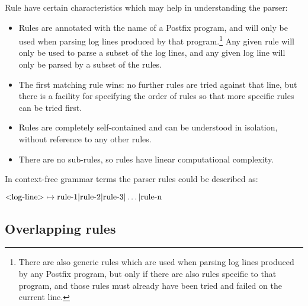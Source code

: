 \documentclass[a4paper,12pt,draft]{article}
\begin{document}
Rule have certain characteristics which may help in understanding the
parser:

\begin{itemize}

    \item Rules are annotated with the name of a Postfix program, and will
        only be used when parsing log lines produced by that
        program.\footnote{There are also generic rules which are used when
        parsing log lines produced by any Postfix program, but only if
        there are also rules specific to that program, and those rules must
        already have been tried and failed on the current line.}  Any given
        rule will only be used to parse a subset of the log lines, and any
        given log line will only be parsed by a subset of the rules.

    \item The first matching rule wins: no further rules are tried against
        that line, but there is a facility for specifying the order of
        rules so that more specific rules can be tried first.

    \item Rules are completely self-contained and can be understood in
        isolation, without reference to any other rules.

    \item There are no sub-rules, so rules have linear computational
        complexity.

\end{itemize}

\label{comparison against context-free grammars}

In context-free grammar terms the parser rules could be described as:

$\text{\textless{}log-line\textgreater{}} \mapsto \text{rule-1} |
\text{rule-2} | \text{rule-3} | \dots | \text{rule-n}$


\subsection{Overlapping rules}

\label{overlapping rules}
\end{document}
